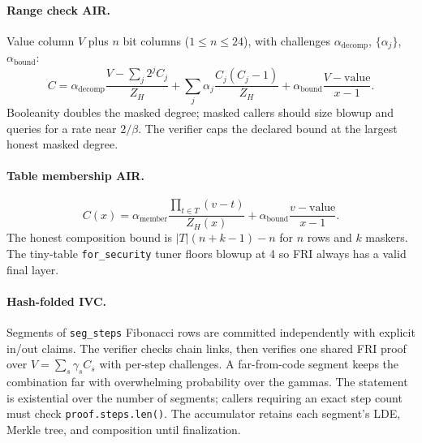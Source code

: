 \documentclass[11pt,a4paper]{article}
\begin{document}
\paragraph{Range check AIR.} Value column $V$ plus $n$ bit columns
($1\le n\le24$), with challenges $\alpha_{\mathrm{decomp}}$,
$\{\alpha_j\}$, $\alpha_{\mathrm{bound}}$:
\[
C=\alpha_{\mathrm{decomp}}\frac{V-\sum_j2^jC_j}{Z_H}
+\sum_j\alpha_j\frac{C_j(C_j-1)}{Z_H}
+\alpha_{\mathrm{bound}}\frac{V-\mathrm{value}}{x-1}.
\]
Booleanity doubles the masked degree; masked callers should size blowup and
queries for a rate near $2/\beta$. The verifier caps the declared bound at
the largest honest masked degree.

\paragraph{Table membership AIR.}
\[
C(x)=\alpha_{\mathrm{member}}\frac{\prod_{t\in T}(v-t)}{Z_H(x)}
+\alpha_{\mathrm{bound}}\frac{v-\mathrm{value}}{x-1}.
\]
The honest composition bound is $|T|(n+k-1)-n$ for $n$ rows and $k$ maskers.
The tiny-table \texttt{for\_security} tuner floors blowup at 4 so FRI always
has a valid final layer.

\paragraph{Hash-folded IVC.} Segments of \texttt{seg\_steps} Fibonacci rows
are committed independently with explicit in/out claims. The verifier checks
chain links, then verifies one shared FRI proof over
$V=\sum_s\gamma_sC_s$ with per-step challenges. A far-from-code segment keeps
the combination far with overwhelming probability over the gammas. The
statement is existential over the number of segments; callers requiring an
exact step count must check \texttt{proof.steps.len()}. The accumulator
retains each segment's LDE, Merkle tree, and composition until finalization.
\end{document}

